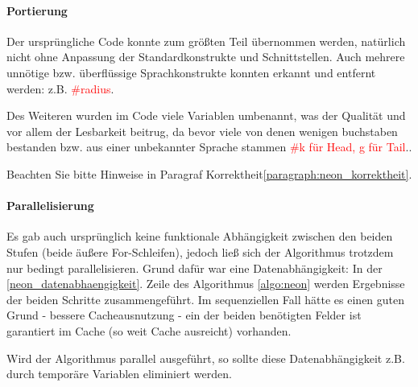 \paragraph{Portierung}
\label{neon_portierung}
Der ursprüngliche Code konnte zum größten Teil übernommen werden, natürlich nicht ohne Anpassung der Standardkonstrukte und Schnittstellen.
Auch mehrere unnötige bzw. überflüssige Sprachkonstrukte konnten erkannt und entfernt werden: z.B.  \textcolor{red}{\#radius}.

Des Weiteren wurden im Code viele Variablen umbenannt, was der Qualität und vor allem der Lesbarkeit beitrug, da bevor viele von denen wenigen buchstaben bestanden bzw. aus einer unbekannter Sprache stammen \textcolor{red}{\#k für Head, g für Tail}..

Beachten Sie bitte Hinweise in Paragraf Korrektheit\ref{paragraph:neon_korrektheit}.
















\paragraph{Parallelisierung}
Es gab auch ursprünglich keine funktionale Abhängigkeit zwischen den beiden Stufen (beide äußere For-Schleifen),  jedoch ließ sich der Algorithmus trotzdem nur bedingt parallelisieren. Grund dafür war eine Datenabhängigkeit: In der \ref{neon_datenabhaengigkeit}. Zeile des Algorithmus \ref{algo:neon} werden Ergebnisse der beiden Schritte zusammengeführt. Im sequenziellen Fall hätte es einen guten Grund - bessere Cacheausnutzung - ein der beiden benötigten Felder ist garantiert im Cache (so weit Cache ausreicht) vorhanden.

Wird der Algorithmus parallel ausgeführt, so sollte diese Datenabhängigkeit z.B. durch temporäre Variablen eliminiert werden. 


